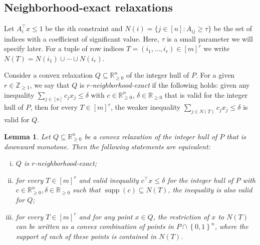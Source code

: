 \documentclass[11pt]{article}
\newcommand{\larstodo}[1]{\todo[backgroundcolor=pinktransparent, linecolor=pink!80]{#1}}
\newcommand{\R}{\mathbb{R}}
\newcommand{\Z}{\mathbb{Z}}
\DeclareMathOperator{\supp}{supp}
\newcommand{\rhs}{\delta}
\newcommand{\numrows}{r}
\newtheorem{lemma}[theorem]{Lemma}
\newcommand{\set}[1]{\left\{#1\right\}}
\theoremstyle{remark}
\begin{document}
\subsection{Neighborhood-exact relaxations}
\label{sec:r-neighbor}

Let $A_i^\intercal x \le 1$ be the $i$th constraint and $N(i) = \{j\in [n] : A_{ij} \ge \tau\}$
be the set of indices with a coefficient of significant value. Here, $\tau$ is a small parameter we will specify later.
For a tuple of row indices $T = (i_1,\dotsc,i_r) \in [m]^r$ we write $N(T) = N(i_1) \cup \cdots \cup N(i_r)$.

Consider a convex relaxation $Q \subseteq \R^n_{\ge 0}$ of the integer hull of $P$. For a given $r \in \Z_{\geq 1}$, we say that $Q$ is \emph{$\numrows$-neighborhood-exact} if the following holds: given any inequality $\sum_{j \in [n]} c_j x_j \le \rhs$ with $c \in \R^n_{\ge 0}$, $\rhs \in \R_{\ge 0}$ that is valid for the integer hull of $P$, then for every $T \in [m]^\numrows$, the weaker inequality $\sum_{j \in N(T)} c_j x_j \le \rhs$ is valid for $Q$. 

\begin{lemma}\label{lem:r-nbh-exact-equivalence}
	Let $Q \subseteq \R^n_{\ge 0}$ be a convex relaxation of the integer hull of $P$ that is downward monotone. Then the following statements are equivalent:
\begin{enumerate}[(i)]
\item $Q$ is $\numrows$-neighborhood-exact;
\item for every $T \in [m]^\numrows$ and valid inequality $c^\intercal x \le \rhs$ for the integer hull of $P$ with $c \in \R^n_{\ge 0}, \rhs \in \R_{\ge 0}$ such that $\supp(c) \subseteq N(T)$, the inequality is also valid for $Q$;
\item for every $T \in [m]^\numrows$ and for any point $x \in Q$, the restriction of $x$ to $N(T)$ can be written as a convex combination of points in $P\cap \set{0,1}^n$, where the support of each of these points is contained in $N(T)$.
\end{enumerate}
\end{lemma}
\end{document}
